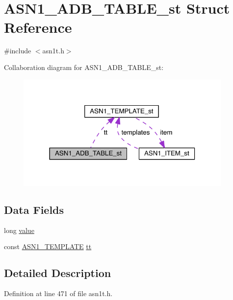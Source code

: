 \hypertarget{struct_a_s_n1___a_d_b___t_a_b_l_e__st}{}\section{A\+S\+N1\+\_\+\+A\+D\+B\+\_\+\+T\+A\+B\+L\+E\+\_\+st Struct Reference}
\label{struct_a_s_n1___a_d_b___t_a_b_l_e__st}


{\ttfamily \#include $<$asn1t.\+h$>$}



Collaboration diagram for A\+S\+N1\+\_\+\+A\+D\+B\+\_\+\+T\+A\+B\+L\+E\+\_\+st\+:\nopagebreak
\begin{figure}[H]
\begin{center}
\leavevmode
\includegraphics[width=302pt]{struct_a_s_n1___a_d_b___t_a_b_l_e__st__coll__graph}
\end{center}
\end{figure}
\subsection*{Data Fields}
\begin{DoxyCompactItemize}
\item 
long \hyperlink{struct_a_s_n1___a_d_b___t_a_b_l_e__st_a6ccc3a2456c4631091ce42a637053789}{value}
\item 
const \hyperlink{crypto_2asn1_2asn1_8h_a6c952ee1ae445fda1ca8e1761bbd93ac}{A\+S\+N1\+\_\+\+T\+E\+M\+P\+L\+A\+TE} \hyperlink{struct_a_s_n1___a_d_b___t_a_b_l_e__st_ad89b57c7714b2c401003be33090f8c40}{tt}
\end{DoxyCompactItemize}


\subsection{Detailed Description}


Definition at line 471 of file asn1t.\+h.



